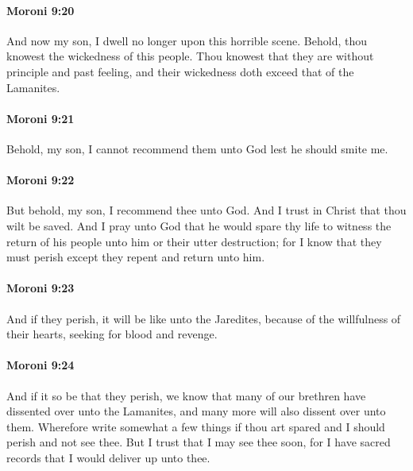 		\paragraph{Moroni 9:20} %
			\label{MORONI-9-20}

			And now my son, I dwell no longer upon this horrible scene.
			Behold, thou knowest the wickedness of this people.
			Thou knowest that they are without principle and past feeling,
			and their wickedness doth exceed that of the Lamanites.

		\paragraph{Moroni 9:21} %
			\label{MORONI-9-21}

			Behold, my son, I cannot recommend them unto God
			lest he should smite me.

		\paragraph{Moroni 9:22} %
			\label{MORONI-9-22}

			But behold, my son, I recommend thee unto God.
			And I trust in Christ that thou wilt be saved.
			And I pray unto God that he would spare thy life
			to witness the return of his people unto him or their utter destruction;
			for I know that they must perish except they repent and return unto him.

		\paragraph{Moroni 9:23} %
			\label{MORONI-9-23}

			And if they perish, it will be like unto the Jaredites,
			because of the willfulness of their hearts,
			seeking for blood and revenge.

		\paragraph{Moroni 9:24} %
			\label{MORONI-9-24}

			And if it so be that they perish,
			we know that many of our brethren have dissented over unto the Lamanites,
			and many more will also dissent over unto them.
			Wherefore write somewhat a few things
			if thou art spared and I should perish and not see thee.
			But I trust that I may see thee soon,
			for I have sacred records that I would deliver up unto thee.

